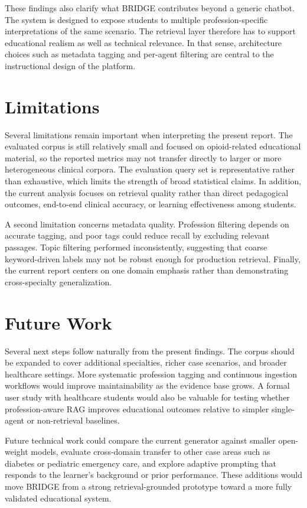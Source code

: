 \documentclass[12pt]{article}
\begin{document}
These findings also clarify what BRIDGE contributes beyond a generic chatbot. The system is designed to expose students to multiple profession-specific interpretations of the same scenario. The retrieval layer therefore has to support educational realism as well as technical relevance. In that sense, architecture choices such as metadata tagging and per-agent filtering are central to the instructional design of the platform.

\section{Limitations}

Several limitations remain important when interpreting the present report. The evaluated corpus is still relatively small and focused on opioid-related educational material, so the reported metrics may not transfer directly to larger or more heterogeneous clinical corpora. The evaluation query set is representative rather than exhaustive, which limits the strength of broad statistical claims. In addition, the current analysis focuses on retrieval quality rather than direct pedagogical outcomes, end-to-end clinical accuracy, or learning effectiveness among students.

A second limitation concerns metadata quality. Profession filtering depends on accurate tagging, and poor tags could reduce recall by excluding relevant passages. Topic filtering performed inconsistently, suggesting that coarse keyword-driven labels may not be robust enough for production retrieval. Finally, the current report centers on one domain emphasis rather than demonstrating cross-specialty generalization.


\section{Future Work}

Several next steps follow naturally from the present findings. The corpus should be expanded to cover additional specialties, richer case scenarios, and broader healthcare settings. More systematic profession tagging and continuous ingestion workflows would improve maintainability as the evidence base grows. A formal user study with healthcare students would also be valuable for testing whether profession-aware RAG improves educational outcomes relative to simpler single-agent or non-retrieval baselines.

Future technical work could compare the current generator against smaller open-weight models, evaluate cross-domain transfer to other case areas such as diabetes or pediatric emergency care, and explore adaptive prompting that responds to the learner's background or prior performance. These additions would move BRIDGE from a strong retrieval-grounded prototype toward a more fully validated educational system.
\end{document}
